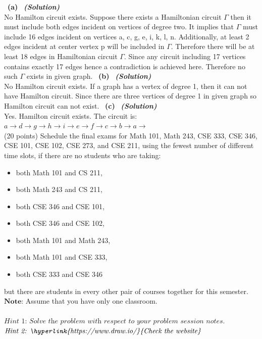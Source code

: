 \documentclass[a4 paper]{article}
\numberwithin{equation}{section}
\newcommand{\problem}[2]{~\\\fbox{\textbf{Problem #1}}\hfill (#2 points)\newline\newline}
\newcommand{\subproblem}[1]{~\newline\textbf{(#1)}}
\newcommand{\solution}{~\newline\textbf{\textit{(Solution)}} }
\newcommand{\0}{\mathbf{0}}
\begin{document}
\subproblem{a} \solution\\
No Hamilton circuit exists.\newline
Suppose there exists a Hamiltonian circuit $\Gamma$ then it must include both edges incident on vertices of degree two. It implies that $\Gamma$ must include 16 edges incident on vertices a, c, g, e, i, k, l, n.\newline
Additionally, at least 2 edges incident at center vertex p will be included in $\Gamma$. Therefore there will be at least 18 edges in Hamiltonian circuit $\Gamma$. Since any circuit including 17 vertices contains exactly 17 edges hence a contradiction is achieved here. Therefore no such $\Gamma$ exists in given graph.
\subproblem{b} \solution\\
No Hamilton circuit exists.\newline
If a graph has a vertex of degree 1, then it can not have Hamilton circuit. Since there are three vertices of degree 1 in given graph so Hamilton circuit can not exist.
\subproblem{c} \solution\\
Yes. Hamilton circuit exists. The circuit is:\newline
$a \rightarrow d \rightarrow g \rightarrow h \rightarrow i \rightarrow e \rightarrow f \rightarrow c \rightarrow b \rightarrow a \rightarrow $
\newpage
\problem{3: Applications on Graphs}{20}
Schedule the final exams for Math 101, Math 243, CSE 333, CSE 346, CSE 101, CSE 102, CSE 273, and CSE 211, using the fewest number of different time slots, if there are no students who are taking:
\begin{itemize}
	\item both Math 101 and CS 211,
	\item both Math 243 and CS 211,
	\item both CSE 346 and CSE 101,
	\item both CSE 346 and CSE 102,
	\item both Math 101 and Math 243,
	\item both Math 101 and CSE 333,
	\item both CSE 333 and CSE 346
\end{itemize}
but there are students in every other pair of courses together for this semester.\\ 
$\textbf{Note:}$ Assume that you have only one classroom.\\ \\
$\textit{Hint 1: Solve the problem with respect to your problem session notes.}$\\
$\textit{Hint 2: \hyperlink{https://www.draw.io/}{Check the website}}$
\end{document}
